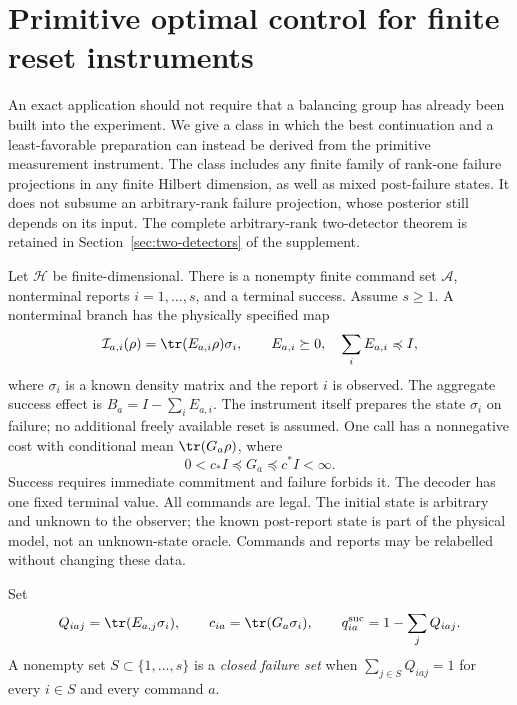 \section{Primitive optimal control for finite reset instruments}\label{sec:reset-control}
An exact application should not require that a balancing group has already been built into the experiment. We give a class in which the best continuation and a least-favorable preparation can instead be derived from the primitive measurement instrument. The class includes any finite family of rank-one failure projections in any finite Hilbert dimension, as well as mixed post-failure states. It does not subsume an arbitrary-rank failure projection, whose posterior still depends on its input. The complete arbitrary-rank two-detector theorem is retained in Section~\ref{sec:two-detectors} of the supplement.

Let $\mathcal H$ be finite-dimensional. There is a nonempty finite command set $\mathcal A$, nonterminal reports $i=1,\ldots,s$, and a terminal success. Assume $s\ge1$. A nonterminal branch has the physically specified map
\begin{equation}\label{eq:reset-instrument}
 \mathcal I_{a,i}(\rho)=\tr(E_{a,i}\rho)\sigma_i,
 \qquad E_{a,i}\succeq0,\quad \sum_i E_{a,i}\preccurlyeq I,
\end{equation}
where $\sigma_i$ is a known density matrix and the report $i$ is observed. The aggregate success effect is $B_a=I-\sum_iE_{a,i}$. The instrument itself prepares the state $\sigma_i$ on failure; no additional freely available reset is assumed. One call has a nonnegative cost with conditional mean $\tr(G_a\rho)$, where
\[
 0<c_*I\preccurlyeq G_a\preccurlyeq c^*I<\infty.
\]
Success requires immediate commitment and failure forbids it. The decoder has one fixed terminal value. All commands are legal. The initial state is arbitrary and unknown to the observer; the known post-report state is part of the physical model, not an unknown-state oracle. Commands and reports may be relabelled without changing these data.

Set
\[
 Q_{iaj}=\tr(E_{a,j}\sigma_i),\qquad c_{ia}=\tr(G_a\sigma_i),
 \qquad q_{ia}^{\rm suc}=1-\sum_jQ_{iaj}.
\]
A nonempty set $S\subset\{1,\ldots,s\}$ is a \emph{closed failure set} when $\sum_{j\in S}Q_{iaj}=1$ for every $i\in S$ and every command $a$.

